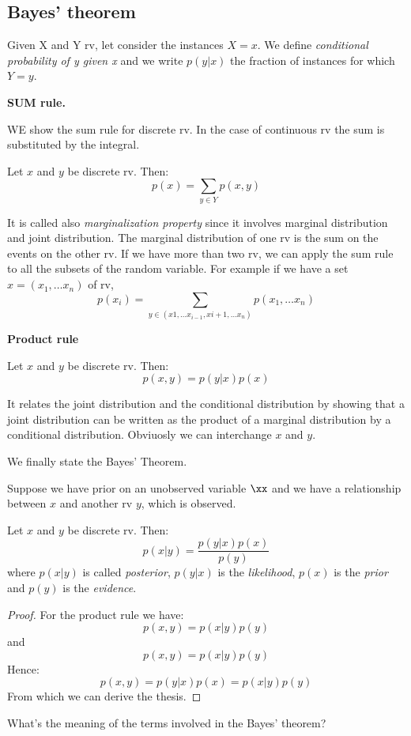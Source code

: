 \subsection{Bayes' theorem}

\begin{definition}
   Given X and Y rv, let consider the instances $X=x$. We define \textit{conditional probability of y given x} and we write $p(y|x)$ the fraction of instances for which $Y=y$.
\end{definition}

\textbf{SUM rule.}

WE show the sum rule for discrete rv. In the case of continuous rv the sum is substituted by the integral.

\begin{proposition}
Let $x$ and $y$ be discrete rv. Then:
$$p(x)= \sum_{y \in Y} p(x,y)$$
\end{proposition}

It is called also \textit{marginalization property} since it involves marginal distribution and joint distribution. The marginal distribution of one rv is the sum on the events on the other rv. If we have more than two rv, we can apply the sum rule to all the subsets of the random variable. For example if we have a set $x=(x_1, \ldots x_n)$ of rv, 
$$p(x_i)=\sum_{y \in (x1, \ldots x_{i-1}, x{i+1}, \ldots x_n)} p(x_1, \ldots x_n)$$

\textbf{Product rule}

\begin{proposition}
Let $x$ and $y$ be discrete rv. Then:
$$p(x,y) =p(y|x)p(x)$$
\end{proposition}

It relates the joint distribution and the conditional distribution by showing that a joint distribution can be written as the product of a marginal distribution by a conditional distribution.
Obviuosly we can interchange $x$ and $y$.

We finally state the Bayes' Theorem.

Suppose we have prior on an unobserved variable $\xx$ and we have a relationship between $x$ and another rv $y$, which is observed.
\begin{proposition}
    Let $x$ and $y$ be discrete rv.
    Then:
    $$p(x|y)=\frac{p(y|x)p(x)}{p(y)}$$
    where $p(x|y)$ is called \textit{posterior}, $p(y|x)$ is the \textit{likelihood}, $p(x)$ is the \textit{prior} and $p(y)$ is the \textit{evidence}.
    \end{proposition}
    \begin{proof}
    For the product rule we have:
$$p(x,y) =p(x|y)p(y)$$
and
$$p(x,y) =p(x|y)p(y)$$
Hence:
$$p(x,y) =p(y|x)p(x)=p(x|y)p(y)$$
From which we can derive the thesis.
\end{proof}
What's the meaning of the terms involved in the Bayes' theorem?


